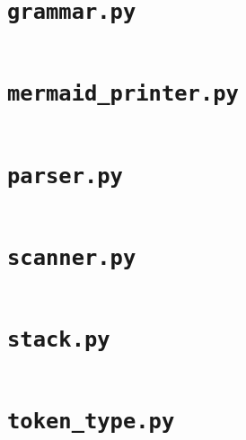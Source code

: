 \inputminted{python}{/Users/valerie/Documents/Sixth-Form/Computer-Science/nea-full-repo/lilac-implementation/lilac/error_system.py}

\cprotect\section{\verb|grammar.py|}\label{code:grammar}

\inputminted{python}{/Users/valerie/Documents/Sixth-Form/Computer-Science/nea-full-repo/lilac-implementation/lilac/grammar.py}

\cprotect\section{\verb|mermaid_printer.py|}\label{code:mermaid_printer}

\inputminted{python}{/Users/valerie/Documents/Sixth-Form/Computer-Science/nea-full-repo/lilac-implementation/lilac/mermaid_printer.py}

\cprotect\section{\verb|parser.py|}\label{code:parser}

\inputminted{python}{/Users/valerie/Documents/Sixth-Form/Computer-Science/nea-full-repo/lilac-implementation/lilac/parser.py}

\cprotect\section{\verb|scanner.py|}\label{code:scanner}

\inputminted{python}{/Users/valerie/Documents/Sixth-Form/Computer-Science/nea-full-repo/lilac-implementation/lilac/scanner.py}

\cprotect\section{\verb|stack.py|}\label{code:stack}

\inputminted{python}{/Users/valerie/Documents/Sixth-Form/Computer-Science/nea-full-repo/lilac-implementation/lilac/stack.py}

\cprotect\section{\verb|token_type.py|}\label{code:token_type}

\inputminted{python}{/Users/valerie/Documents/Sixth-Form/Computer-Science/nea-full-repo/lilac-implementation/lilac/token_type.py}

